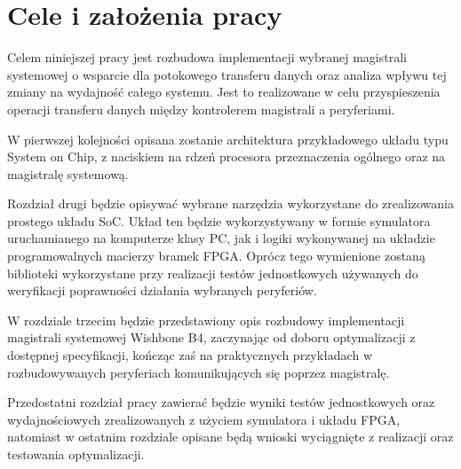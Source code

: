 \section{Cele i założenia pracy}

Celem niniejszej pracy jest rozbudowa implementacji wybranej magistrali systemowej o wsparcie dla potokowego transferu danych oraz analiza wpływu tej zmiany na wydajność całego systemu. Jest to realizowane w celu przyspieszenia operacji transferu danych między kontrolerem magistrali a peryferiami.

W pierwszej kolejności opisana zostanie architektura przykładowego układu typu System on Chip, z naciskiem na rdzeń procesora przeznaczenia ogólnego oraz na magistralę systemową.

Rozdział drugi będzie opisywać wybrane narzędzia wykorzystane do zrealizowania prostego układu SoC. Układ ten będzie wykorzystywany w formie symulatora uruchamianego na komputerze klasy PC, jak i logiki wykonywanej na układzie programowalnych macierzy bramek FPGA. Oprócz tego wymienione zostaną biblioteki wykorzystane przy realizacji testów jednostkowych używanych do weryfikacji poprawności działania wybranych peryferiów.

W rozdziale trzecim będzie przedstawiony opis rozbudowy implementacji magistrali systemowej Wishbone B4, zaczynając od doboru optymalizacji z dostępnej specyfikacji, kończąc zaś na praktycznych przykładach w rozbudowywanych peryferiach komunikujących się poprzez magistralę.

Przedostatni rozdział pracy zawierać będzie wyniki testów jednostkowych oraz wydajnościowych zrealizowanych z użyciem symulatora i układu FPGA, natomiast w ostatnim rozdziale opisane będą wnioski wyciągnięte z realizacji oraz testowania optymalizacji.
